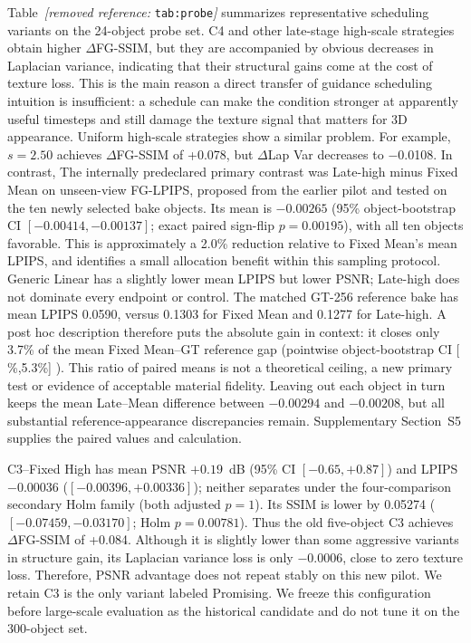 \documentclass[times,twocolumn,final]{elsarticle}
\providecommand{\DIFadd}[1]{{\protect\color{blue} \sf #1}} %
\providecommand{\DIFdel}[1]{{\protect\color{red} \scriptsize #1}} %
\providecommand{\DIFaddbegin}{} %
\providecommand{\DIFaddend}{} %
\providecommand{\DIFdelbegin}{} %
\providecommand{\DIFdelend}{} %
\begin{document}
\DIFdelbegin \DIFdel{Table~\textit{[removed reference: }\texttt{tab:probe}\textit{]} summarizes representative scheduling variants on the 24-object probe set. C4 and other late-stage high-scale strategies obtain higher $\Delta$FG-SSIM, but they are accompanied by obvious decreases in Laplacian variance, indicating that their structural gains come at the cost of texture loss. This is the main reason a direct transfer of guidance scheduling intuition is insufficient: a schedule can make the condition stronger at apparently useful timesteps and still damage the texture signal that matters for 3D appearance. Uniform high-scale strategies show a similar problem. For example, $s = 2.50$ achieves $\Delta$FG-SSIM of +0.078, but $\Delta$Lap Var decreases to $-$0.0108.
In contrast, }\DIFdelend \DIFaddbegin \DIFadd{The internally predeclared primary contrast was Late-high minus Fixed Mean on unseen-view FG-LPIPS, proposed from the earlier pilot and tested on the ten newly selected bake objects. Its mean is $-0.00265$ (95\% object-bootstrap CI $[-0.00414,-0.00137]$; exact paired sign-flip $p=0.00195$), with all ten objects favorable. This is approximately a 2.0\% reduction relative to Fixed Mean's mean LPIPS, and identifies a small allocation benefit within this sampling protocol. Generic Linear has a slightly lower mean LPIPS but lower PSNR; Late-high does not dominate every endpoint or control. The matched GT-256 reference bake has mean LPIPS 0.0590, versus 0.1303 for Fixed Mean and 0.1277 for Late-high. A post hoc description therefore puts the absolute gain in context: it closes only 3.7\% of the mean Fixed Mean--GT reference gap (pointwise object-bootstrap CI }[\DIFadd{2.3\%,5.3\%}]\DIFadd{). This ratio of paired means is not a theoretical ceiling, a new primary test or evidence of acceptable material fidelity. Leaving out each object in turn keeps the mean Late--Mean difference between $-0.00294$ and $-0.00208$, but all substantial reference-appearance discrepancies remain. Supplementary Section~S5 supplies the paired values and calculation.
}

\DIFadd{C3--Fixed High has mean PSNR $+0.19$~dB (95\% CI $[-0.65,+0.87]$) and LPIPS $-0.00036$ ($[-0.00396,+0.00336]$); neither separates under the four-comparison secondary Holm family (both adjusted $p=1$). Its SSIM is lower by 0.05274 ($[-0.07459,-0.03170]$; Holm $p=0.00781$). Thus the old five-object }\DIFaddend C3 \DIFdelbegin \DIFdel{achieves $\Delta$FG-SSIM of +0.084. Although it is slightly lower than some aggressive variants in structure gain, its Laplacian variance loss is only $-$0.0006, close to zero texture loss. Therefore, }\DIFdelend \DIFaddbegin \DIFadd{PSNR advantage does not repeat stably on this new pilot. We retain }\DIFaddend C3 \DIFdelbegin \DIFdel{is the only variant labeled Promising. We freeze this configuration before large-scale evaluation }\DIFdelend \DIFaddbegin \DIFadd{as the historical candidate }\DIFaddend and do not \DIFdelbegin \DIFdel{tune it on the 300-object set.
}%
\end{document}
